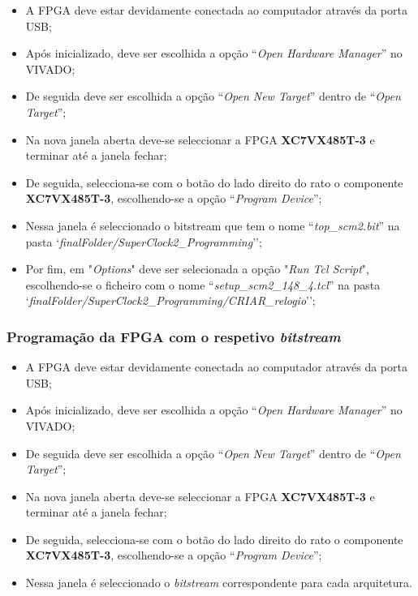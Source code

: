 \documentclass[11pt,a4paper]{article}
\begin{document}
	\begin{itemize}
		\item A FPGA deve estar devidamente conectada ao computador através da porta USB;
		\item Após inicializado, deve ser escolhida a opção ``\textit{Open Hardware Manager}'' no VIVADO;
		\item De seguida deve ser escolhida a opção ``\textit{Open New Target}'' dentro de ``\textit{Open Target}'';
		\item Na nova janela aberta deve-se seleccionar a FPGA \textbf{XC7VX485T-3} e terminar até a janela fechar;
		\item De seguida, selecciona-se com o botão do lado direito do rato o componente \textbf{XC7VX485T-3}, escolhendo-se a opção ``\textit{Program Device}'';
		\item Nessa janela é seleccionado o bitstream que tem o nome ``\textit{top\_scm2.bit}'' na pasta `\textit{finalFolder/SuperClock2\_Programming}'';
		\item Por fim, em "\textit{Options}" deve ser selecionada a opção "\textit{Run Tcl Script}", escolhendo-se o ficheiro com o nome ``\textit{setup\_scm2\_148\_4.tcl}'' na pasta `\textit{finalFolder/SuperClock2\_Programming/CRIAR\_relogio}''; 
	\end{itemize}
	
	\subsubsection{Programação da FPGA com o respetivo \textit{bitstream}}
	
	\begin{itemize}
		\item A FPGA deve estar devidamente conectada ao computador através da porta USB;
		\item Após inicializado, deve ser escolhida a opção ``\textit{Open Hardware Manager}'' no VIVADO;
		\item De seguida deve ser escolhida a opção ``\textit{Open New Target}'' dentro de ``\textit{Open Target}'';
		\item Na nova janela aberta deve-se seleccionar a FPGA \textbf{XC7VX485T-3} e terminar até a janela fechar;
		\item De seguida, selecciona-se com o botão do lado direito do rato o componente \textbf{XC7VX485T-3}, escolhendo-se a opção ``\textit{Program Device}'';
		\item Nessa janela é seleccionado o \textit{bitstream} correspondente para cada arquitetura.
	\end{itemize}
	
\end{document}
